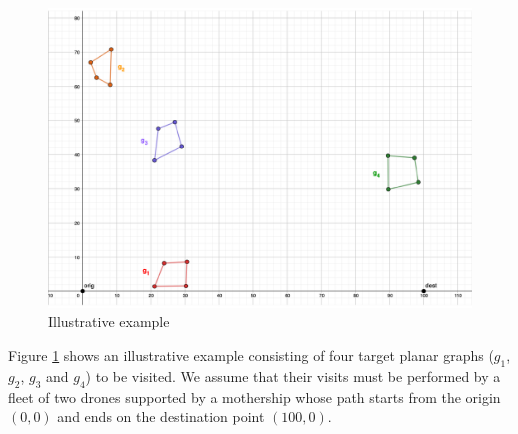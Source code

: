 \noindent



\begin{figure}[h]
\centering
\includegraphics[width = 0.5\linewidth]{figures/example_new.pdf}
\caption{Illustrative example \label{fig:example1}}
\end{figure}

\noindent
Figure \ref{fig:example1} shows an illustrative example consisting of four target planar graphs ($g_1$, $g_2$, $g_3$ and $g_4$) to be visited. We assume that their visits must be performed by a fleet of two drones supported by a mothership whose path starts from the origin $(0,0)$ and ends on the destination point $(100,0)$.



